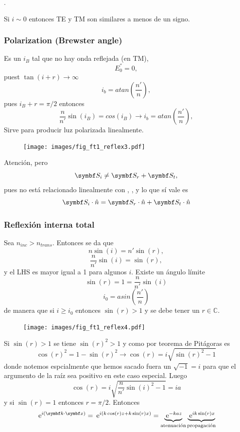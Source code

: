 \documentclass[10pt,oneside]{CBFT_book}
\begin{document}
.

Si $i \sim 0$ entonces TE y TM son similares a menos de un signo.

\subsubsection{Polarization (Brewster angle)}

Es un $i_B$ tal que no hay onda  reflejada (en TM),
\[
	E_0^{''} = 0,
\]
puest $\tan( i + r) \to \infty$
\[
	i_b = atan \left( \frac{n'}{n}\right) ,
\]
pues $ i_B + r = \pi/2$ entonces 
\[
	\frac{n}{n'}\sin(i_B) = cos(i_B) \rightarrow i_b = atan \left( \frac{n'}{n}\right),
\]
Sirve para producir luz polarizada linealmente.

\begin{figure}[htb]
	\begin{center}
	\texttt{[image: images/fig\_ft1\_reflex3.pdf]}	 
	\end{center}
	\caption{}
\end{figure} 

Atención, pero 
\[
	\vb{S}_i \neq \vb{S}_r + \vb{S}_t ,
\]
pues  no está relacionado linealmente con , , y lo que sí vale es
\[
	\vb{S}_i \cdot \hat{n} = \vb{S}_r \cdot \hat{n} + \vb{S}_t \cdot \hat{n} 
\]


\subsubsection{Reflexión interna total}

Sea $ n_{inc} > n_{trans} $. Entonces se da que
\[
	n \sin(i) = n'\sin(r),
\]
\[
	\frac{n}{n'} \sin(i) = \sin(r),
\]
y el LHS es mayor igual a 1 para algunos $i$. Existe un ángulo límite 
\[
	\sin(r) = 1 = \frac{n}{n'} \sin(i) 
\]
\[
	i_0 = asin\left( \frac{n'}{n} \right)
\]
de manera que si $i \geq i_0$ entonces $\sin(r) > 1$ y se debe tener un $r\in \mathbb{C}$.

\begin{figure}[htb]
	\begin{center}
	\texttt{[image: images/fig\_ft1\_reflex4.pdf]}	 
	\end{center}
	\caption{}
\end{figure} 

Si $\sin(r)>1$ se tiene $\sin(r)^2 > 1$ y como por teorema de Pitágoras es 
\[
	\cos(r)^2 = 1 - \sin(r)^2 \rightarrow \cos(r) = i \sqrt{ \sin(r)^2 - 1 }
\]
donde notemos espcialmente que hemos sacado fuera un $\sqrt{-1} = i$ para que el argumento de la raíz sea positivo en 
este caso especial. Luego 
\[
	\cos(r) = i \sqrt{ \frac{n}{n'}\sin(i)^2 - 1 } = i a 
\]
y si $\sin(r) = 1$ entonces $r = \pi/2$.
Entonces
\[
	\euler^{i(\vb{k}\cdot\vb{x})} = \euler^{i(k \cos(r)z + k \sin(r)x)} =
		\underbrace{\euler^{-kaz}}_{\text{atenuación}} 
		\underbrace{\euler^{ik\sin(r)x}}_{\text{propagación}}
\]
\end{document}
